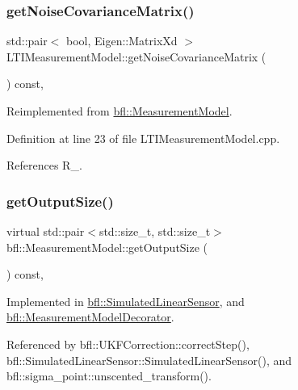 \subsubsection{\texorpdfstring{get\+Noise\+Covariance\+Matrix()}{getNoiseCovarianceMatrix()}}
{\footnotesize\ttfamily std\+::pair$<$ bool, Eigen\+::\+Matrix\+Xd $>$ L\+T\+I\+Measurement\+Model\+::get\+Noise\+Covariance\+Matrix (\begin{DoxyParamCaption}{ }\end{DoxyParamCaption}) const\hspace{0.3cm}{\ttfamily [override]}, {\ttfamily [virtual]}}



Reimplemented from \mbox{\hyperlink{classbfl_1_1MeasurementModel_af25f42076b69e0c6cab47d36d796536f}{bfl\+::\+Measurement\+Model}}.



Definition at line 23 of file L\+T\+I\+Measurement\+Model.\+cpp.



References R\+\_\+.

\mbox{\label{classbfl_1_1MeasurementModel_a6cca2022b576c9dbb61e73b83a10c6ee}} 
\subsubsection{\texorpdfstring{get\+Output\+Size()}{getOutputSize()}}
{\footnotesize\ttfamily virtual std\+::pair$<$std\+::size\+\_\+t, std\+::size\+\_\+t$>$ bfl\+::\+Measurement\+Model\+::get\+Output\+Size (\begin{DoxyParamCaption}{ }\end{DoxyParamCaption}) const\hspace{0.3cm}{\ttfamily [pure virtual]}, {\ttfamily [inherited]}}



Implemented in \mbox{\hyperlink{classbfl_1_1SimulatedLinearSensor_a00e869da2b16b5ead1d76a7b32e9fc4b}{bfl\+::\+Simulated\+Linear\+Sensor}}, and \mbox{\hyperlink{classbfl_1_1MeasurementModelDecorator_a9522d1549c62f55a59401f6fa53421e8}{bfl\+::\+Measurement\+Model\+Decorator}}.



Referenced by bfl\+::\+U\+K\+F\+Correction\+::correct\+Step(), bfl\+::\+Simulated\+Linear\+Sensor\+::\+Simulated\+Linear\+Sensor(), and bfl\+::sigma\+\_\+point\+::unscented\+\_\+transform().

